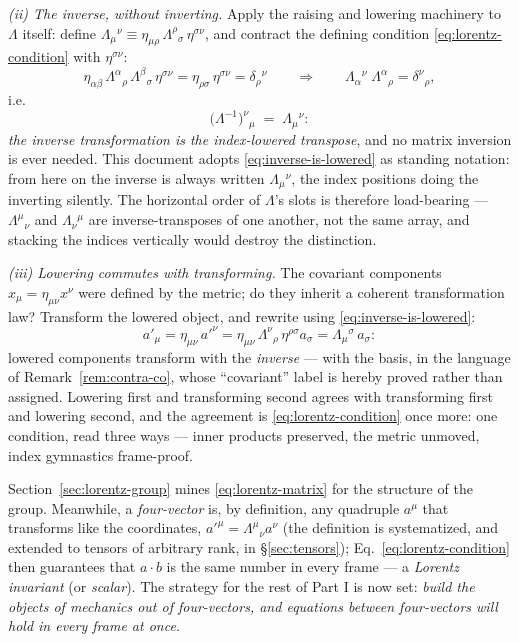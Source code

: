 \documentclass[11pt]{article}
\theoremstyle{plain}
\theoremstyle{definition}
\theoremstyle{remark}
\begin{document}
\emph{(ii) The inverse, without inverting.} Apply the raising and
lowering machinery to $\Lambda$ itself: define
$\Lambda_\mu{}^\nu \equiv
\eta_{\mu\rho}\,\Lambda^\rho{}_\sigma\,\eta^{\sigma\nu}$, and
contract the defining condition \eqref{eq:lorentz-condition} with
$\eta^{\sigma\nu}$:
\begin{equation}
  \eta_{\alpha\beta}\,\Lambda^\alpha{}_\rho\,
  \Lambda^\beta{}_\sigma\,\eta^{\sigma\nu}
  = \eta_{\rho\sigma}\,\eta^{\sigma\nu}
  = \delta_\rho{}^\nu
  \qquad\Longrightarrow\qquad
  \Lambda_\alpha{}^\nu\;\Lambda^\alpha{}_\rho
  = \delta^\nu{}_\rho ,
\end{equation}
i.e.
\begin{equation}
  \boxed{\;
  \bigl(\Lambda^{-1}\bigr)^\nu{}_\mu
  \;=\;
  \Lambda_\mu{}^\nu :
  \;}
  \label{eq:inverse-is-lowered}
\end{equation}
\emph{the inverse transformation is the index-lowered transpose}, and
no matrix inversion is ever needed. This document adopts
\eqref{eq:inverse-is-lowered} as standing notation: from here on the
inverse is always written $\Lambda_\mu{}^\nu$, the index positions
doing the inverting silently. The horizontal order of $\Lambda$'s
slots is therefore load-bearing --- $\Lambda^\mu{}_\nu$ and
$\Lambda_\nu{}^\mu$ are inverse-transposes of one another, not the
same array, and stacking the indices vertically would destroy the
distinction.

\emph{(iii) Lowering commutes with transforming.} The covariant
components $x_\mu = \eta_{\mu\nu}x^\nu$ were defined by the metric;
do they inherit a coherent transformation law? Transform the lowered
object, and rewrite using \eqref{eq:inverse-is-lowered}:
\begin{equation}
  a'_\mu
  = \eta_{\mu\nu}\, a'^\nu
  = \eta_{\mu\nu}\,\Lambda^\nu{}_\rho\,\eta^{\rho\sigma} a_\sigma
  = \Lambda_\mu{}^\sigma\, a_\sigma :
  \label{eq:lowered-transform}
\end{equation}
lowered components transform with the \emph{inverse} --- with the
basis, in the language of Remark~\ref{rem:contra-co}, whose
``covariant'' label is hereby proved rather than assigned. Lowering
first and transforming second agrees with transforming first and
lowering second, and the agreement is
\eqref{eq:lorentz-condition} once more: one condition, read three
ways --- inner products preserved, the metric unmoved, index
gymnastics frame-proof.

Section~\ref{sec:lorentz-group} mines \eqref{eq:lorentz-matrix} for
the structure of the group. Meanwhile, a \emph{four-vector} is, by
definition, any quadruple $a^\mu$ that
transforms like the coordinates, $a'^\mu = \Lambda^\mu{}_\nu a^\nu$
(the definition is systematized, and extended to tensors of arbitrary
rank, in \S\ref{sec:tensors});
Eq.~\eqref{eq:lorentz-condition} then guarantees that $a \cdot b$ is the
same number in every frame --- a \emph{Lorentz invariant} (or
\emph{scalar}). The strategy for the rest of Part I is now set:
\emph{build the objects of mechanics out of four-vectors, and equations
between four-vectors will hold in every frame at once.}
\end{document}

